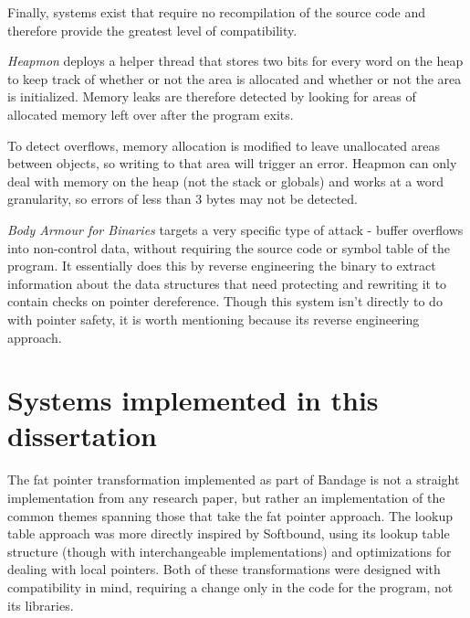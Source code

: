 Finally, systems exist that require no recompilation of the source code and therefore provide the greatest level of compatibility.

\textit{Heapmon} \cite{shetty2005heapmon} deploys a helper thread that stores two bits for every word on the heap to keep track of whether or not the area is allocated and whether or not the area is initialized.
Memory leaks are therefore detected by looking for areas of allocated memory left over after the program exits.

To detect overflows, memory allocation is modified to leave unallocated areas between objects, so writing to that area will trigger an error.
Heapmon can only deal with memory on the heap (not the stack or globals) and works at a word granularity, so errors of less than 3 bytes may not be detected.

\textit{Body Armour for Binaries} \cite{slowinska2012body} targets a very specific type of attack - buffer overflows into non-control data, without requiring the source code or symbol table of the program.
It essentially does this by reverse engineering the binary to extract information about the data structures that need protecting and rewriting it to contain checks on pointer dereference.
Though this system isn't directly to do with pointer safety, it is worth mentioning because its reverse engineering approach.


\section{Systems implemented in this dissertation}

The fat pointer transformation implemented as part of Bandage is not a straight implementation from any research paper, but rather an implementation of the common themes spanning those that take the fat pointer approach.
The lookup table approach was more directly inspired by Softbound, using its lookup table structure (though with interchangeable implementations) and optimizations for dealing with local pointers.
Both of these transformations were designed with compatibility in mind, requiring a change only in the code for the program, not its libraries.

%
%
%
